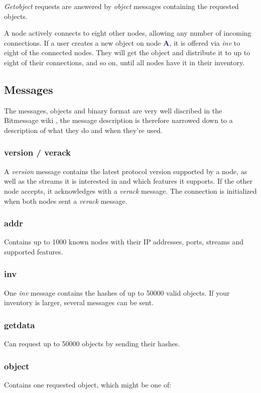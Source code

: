 \documentclass{bfh}
\newcommand{\msg}[1]{\textit{\textcolor{RedOrange}{#1}}}
\newcommand{\node}[1]{\textbf{\textcolor{MidnightBlue}{#1}}}
\begin{document}
  \msg{Getobject} requests are answered by \msg{object} messages containing the requested objects.

  A node actively connects to eight other nodes, allowing any number of incoming connections. If a user creates a new object on node \node{A}, it is offered via \msg{inv} to eight of the connected nodes. They will get the object and distribute it to up to eight of their connections, and so on, until all nodes have it in their inventory.

  \subsection{Messages}

  The messages, objects and binary format are very well discribed in the Bitmessage wiki \cite{wiki:protocol}, the message description is therefore narrowed down to a description of what they do and when they're used.

  \subsubsection{version / verack}
  A \msg{version} message contains the latest protocol version supported by a node, as well as the streams it is interested in and which features it supports. If the other node accepts, it acknowledges with a \msg{verack} message. The connection is initialized when both nodes sent a \msg{verack} message.

  \subsubsection{addr}
  Contains up to 1000 known nodes with their IP addresses, ports, streams and supported features.

  \subsubsection{inv}
  One \msg{inv} message contains the hashes of up to 50000 valid objects. If your inventory is larger, several messages can be sent.

  \subsubsection{getdata}
  Can request up to 50000 objects by sending their hashes.

  \subsubsection{object}
  Contains one requested object, which might be one of:
\end{document}
